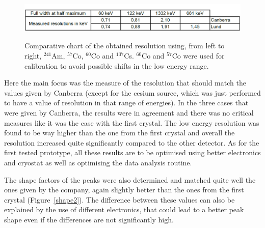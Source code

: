 \documentclass[11pt,a4paper]{article}
\begin{document}
\begin{figure}[!h]
\centering
\caption{Comparative chart of the obtained resolution using, from left to right, $^{241}$Am, $^{57}$Co, $^{60}$Co and $^{137}$Cs. $^{60}$Co and $^{57}$Co were used for calibration to avoid possible shifts in the low energy range.}
\includegraphics[scale=0.6]{result_2.png}
\label{recap2}
\end{figure}
Here the main focus was the measure of the resolution that should match the values given by Canberra (except for the cesium source, which was just performed to have a value of resolution in that range of energies). In the three cases that were given by Canberra, the results were in agreement and there was no critical measures like it was the case with the first crystal. The low energy resolution was found to be way higher than the one from the first crystal and overall the resolution increased quite significantly compared to the other detector. As for the first tested prototype, all these results are to be optimised using better electronics and cryostat as well as optimising the data analysis routine.

The shape factors of the peaks were also determined and matched quite well the ones given by the company, again slightly better than the ones from the first crystal (Figure~\ref{shape2}). The difference between these values can also be explained by the use of different electronics, that could lead to a better peak shape even if the differences are not significantly high.
\end{document}
